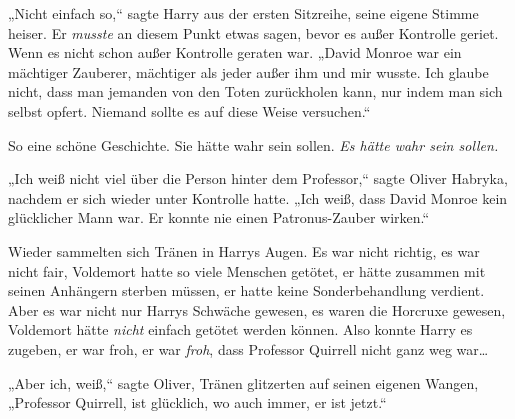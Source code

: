 „Nicht einfach so,“ sagte Harry aus der ersten Sitzreihe, seine eigene Stimme heiser. Er \emph{musste} an diesem Punkt etwas sagen, bevor es außer Kontrolle geriet. Wenn es nicht schon außer Kontrolle geraten war.
„David Monroe war ein mächtiger Zauberer, mächtiger als jeder außer ihm und mir wusste. Ich glaube nicht, dass man jemanden von den Toten zurückholen kann, nur indem man sich selbst opfert. Niemand sollte es auf diese Weise versuchen.“

So eine schöne Geschichte. Sie hätte wahr sein sollen. \emph{Es hätte wahr sein sollen.}

„Ich weiß nicht viel über die Person hinter dem Professor,“ sagte Oliver Habryka, nachdem er sich wieder unter Kontrolle hatte. „Ich weiß, dass David Monroe kein glücklicher Mann war. Er konnte nie einen Patronus-Zauber wirken.“

Wieder sammelten sich Tränen in Harrys Augen.
Es war nicht richtig, es war nicht fair, Voldemort hatte so viele Menschen getötet, er hätte zusammen mit seinen Anhängern sterben müssen, er hatte keine Sonderbehandlung verdient.
Aber es war nicht nur Harrys Schwäche gewesen, es waren die Horcruxe gewesen, Voldemort hätte \emph{nicht} einfach getötet werden können. Also konnte Harry es zugeben, er war froh, er war \emph{froh}, dass Professor Quirrell nicht ganz weg war…

„Aber ich, weiß,“ sagte Oliver, Tränen glitzerten auf seinen eigenen Wangen, „Professor Quirrell, ist glücklich, wo auch immer, er ist jetzt.“


